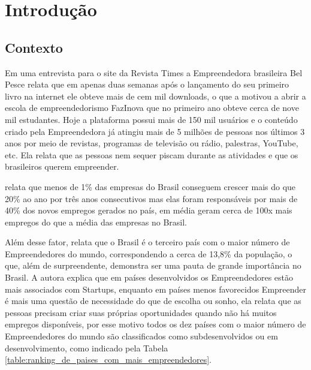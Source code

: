 \chapter{Introdução}
\label{cap-introducao}

\section{Contexto}
\label{section:contexto}

Em uma entrevista para o site da Revista Times a Empreendedora brasileira Bel Pesce relata que em apenas duas semanas após o lançamento do seu primeiro livro na internet ele obteve mais de cem mil downloads, o que a motivou a abrir a escola de empreendedorismo FazInova que no primeiro ano obteve cerca de nove mil estudantes. Hoje a plataforma possui mais de 150 mil usuários e o conteúdo criado pela Empreendedora já atingiu mais de 5 milhões de pessoas nos últimos 3 anos por meio de revistas, programas de televisão ou rádio, palestras, YouTube, etc. Ela relata que as pessoas nem sequer piscam durante as atividades e que os brasileiros querem empreender.

 relata que menos de 1\% das empresas do Brasil conseguem crescer mais do que 20\% ao ano por três anos consecutivos mas elas foram responsáveis por mais de 40\% dos novos empregos gerados no país, em média geram cerca de 100x mais empregos do que a média das empresas no Brasil. 

Além desse fator,  relata que o Brasil é o terceiro país com o maior número de Empreendedores do mundo, correspondendo a cerca de 13,8\% da população, o que, além de surpreendente, demonstra ser uma pauta de grande importância no Brasil. A autora explica que em países desenvolvidos os Empreendedores estão mais associados com Startups, enquanto em países menos favorecidos Empreender é mais uma questão de necessidade do que de escolha ou sonho, ela relata que as pessoas precisam criar suas próprias oportunidades quando não há muitos empregos disponíveis, por esse motivo todos os dez países com o maior número de Empreendedores do mundo são classificados como subdesenvolvidos ou em desenvolvimento, como indicado pela Tabela \ref{table:ranking_de_paises_com_mais_empreendedores}.


